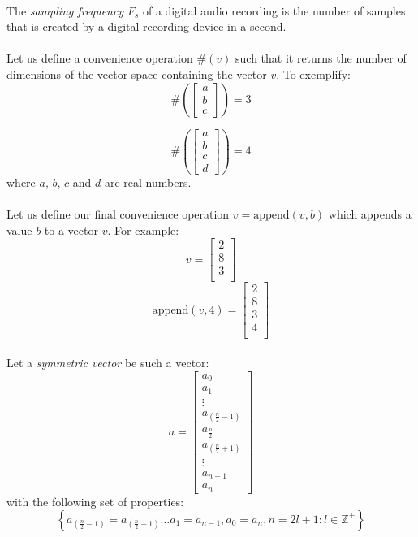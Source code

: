 \documentclass{article}
\begin{document}
\paragraph*{}
The \textit{sampling frequency} $F_s$ of a digital audio recording is the
number of samples that is created by a digital recording device in a second.

\paragraph*{}
Let us define a convenience operation $\#(v)$ such that it returns the number
of dimensions of the vector space containing the vector $v$. To exemplify:
$$\# \left( \begin{bmatrix} a \\ b \\ c\end{bmatrix} \right) = 3$$

$$\# \left( \begin{bmatrix} a \\ b \\ c \\ d \end{bmatrix} \right) = 4$$
where $a$, $b$, $c$ and $d$ are real numbers.

\paragraph*{}
Let us define our final convenience operation $v = \text{append}(v, b)$ which
appends a value $b$ to a vector $v$. For example:
$$
v =
\begin{bmatrix}
	2 \\
	8 \\
	3 \\
\end{bmatrix}
$$
$$
\text{append}\left( v, 4 \right) =
\begin{bmatrix}
	2 \\
	8 \\
	3 \\
	4 \\
\end{bmatrix}
$$

\paragraph*{}
Let a \textit{symmetric vector} be such a vector:
$$a =
\begin{bmatrix}
	a_0 \\
	a_1 \\
	\vdots \\
	a_{\left( \frac{n}{2} - 1 \right)} \\
	a_{\frac{n}{2}} \\
	a_{\left( \frac{n}{2} + 1 \right) } \\
	\vdots \\
	a_{n-1} \\
	a_n
\end{bmatrix}
$$
with the following set of properties:
$$
\left\{
	 a_{\left( \frac{n}{2} - 1 \right)} = a_{\left( \frac{n}{2} + 1 \right)}
	 \dots a_1 = a_{n-1}, a_0 = a_n , n = 2l + 1 : l \in \mathbb{Z}^+
\right\}
$$
\end{document}
